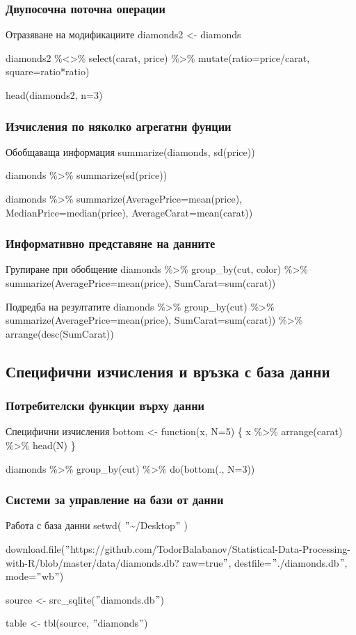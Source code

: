 \documentclass{beamer}
\begin{document}
\begin{frame}
\frametitle{Двупосочна поточна операции}
\begin{block}{Отразяване на модификациите}
diamonds2 <- diamonds

diamonds2 \%<>\% select(carat, price) \%>\% mutate(ratio=price/carat, square=ratio*ratio)

head(diamonds2, n=3)
\end{block}
\end{frame}

\begin{frame}
\frametitle{Изчисления по няколко агрегатни фунции}
\begin{block}{Обобщаваща информация}
summarize(diamonds, sd(price))

diamonds \%>\% summarize(sd(price))

diamonds \%>\% summarize(AveragePrice=mean(price), MedianPrice=median(price), AverageCarat=mean(carat))
\end{block}
\end{frame}

\begin{frame}
\frametitle{Информативно представяне на данните}
\begin{block}{Групиране при обобщение}
diamonds \%>\% group\_by(cut, color) \%>\% summarize(AveragePrice=mean(price), SumCarat=sum(carat))
\end{block}

\begin{block}{Подредба на резултатите}
diamonds \%>\% group\_by(cut) \%>\% summarize(AveragePrice=mean(price), SumCarat=sum(carat)) \%>\% arrange(desc(SumCarat))
\end{block}
\end{frame}

\subsection{Специфични изчисления и връзка с база данни}

\begin{frame}
\frametitle{Потребителски функции върху данни}
\begin{block}{Специфични изчисления}
bottom <- function(x, N=5) \{ x \%>\% arrange(carat) \%>\% head(N) \}

diamonds \%>\% group\_by(cut) \%>\% do(bottom(., N=3))
\end{block}
\end{frame}

\begin{frame}
\frametitle{Системи за управление на бази от данни}
\begin{block}{Работа с база данни}
setwd( $"$\textasciitilde /Desktop$"$ )

download.file($"$https://github.com/TodorBalabanov/Statistical-Data-Processing-with-R/blob/master/data/diamonds.db? raw=true$"$, destfile=$"$./diamonds.db$"$, mode=$"$wb$"$)

source <- src\_sqlite($"$diamonds.db$"$)

table <- tbl(source, $"$diamonds$"$)
\end{block}
\end{frame}
\end{document}
